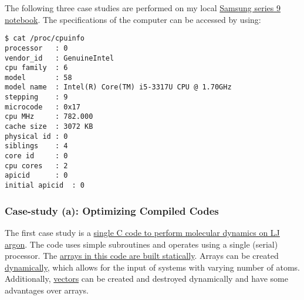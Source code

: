 The following three case studies are performed on my local 
\href{http://www.samsung.com/us/computer/series-9-notebooks}
{Samsung series 9 notebook}. The 
specifications of the computer can be accessed by using:
\begin{lstlisting}
$ cat /proc/cpuinfo 
processor	: 0
vendor_id	: GenuineIntel
cpu family	: 6
model		: 58
model name	: Intel(R) Core(TM) i5-3317U CPU @ 1.70GHz
stepping	: 9
microcode	: 0x17
cpu MHz		: 782.000
cache size	: 3072 KB
physical id	: 0
siblings	: 4
core id		: 0
cpu cores	: 2
apicid		: 0
initial apicid	: 0
\end{lstlisting}

\subsubsection{\label{A:coding_lang:case1}Case-study (a): 
Optimizing Compiled Codes}

The first case study is a 
\href{https://github.com/jasonlarkin/disorder/tree/master/md_serial}
{single C code to perform molecular dynamics 
on LJ argon}. The code uses simple subroutines and operates using 
a single (serial) processor. The 
\href{http://www.cplusplus.com/doc/tutorial/arrays/}
{arrays in this code are built statically}. 
Arrays can be created 
\href{http://www.cplusplus.com/doc/tutorial/dynamic/}{dynamically}, 
which allows for the input of systems with varying number of 
atoms. Additionally, 
\href{http://www.cplusplus.com/reference/vector/vector/}{vectors} 
can be created and destroyed dynamically and have some advantages 
over arrays.  

